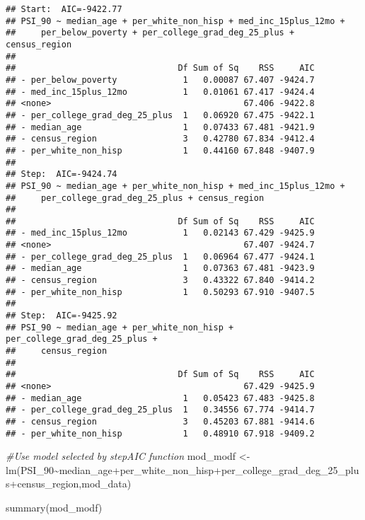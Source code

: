 \documentclass[
]{article}
\newenvironment{Shaded}{\begin{snugshade}}{\end{snugshade}}
\newcommand{\CommentTok}[1]{\textcolor[rgb]{0.56,0.35,0.01}{\textit{#1}}}
\newcommand{\FunctionTok}[1]{\textcolor[rgb]{0.00,0.00,0.00}{#1}}
\newcommand{\NormalTok}[1]{#1}
\newcommand{\OtherTok}[1]{\textcolor[rgb]{0.56,0.35,0.01}{#1}}
\newcommand{\SpecialCharTok}[1]{\textcolor[rgb]{0.00,0.00,0.00}{#1}}
\begin{document}
\begin{verbatim}
## Start:  AIC=-9422.77
## PSI_90 ~ median_age + per_white_non_hisp + med_inc_15plus_12mo + 
##     per_below_poverty + per_college_grad_deg_25_plus + census_region
## 
##                                Df Sum of Sq    RSS     AIC
## - per_below_poverty             1   0.00087 67.407 -9424.7
## - med_inc_15plus_12mo           1   0.01061 67.417 -9424.4
## <none>                                      67.406 -9422.8
## - per_college_grad_deg_25_plus  1   0.06920 67.475 -9422.1
## - median_age                    1   0.07433 67.481 -9421.9
## - census_region                 3   0.42780 67.834 -9412.4
## - per_white_non_hisp            1   0.44160 67.848 -9407.9
## 
## Step:  AIC=-9424.74
## PSI_90 ~ median_age + per_white_non_hisp + med_inc_15plus_12mo + 
##     per_college_grad_deg_25_plus + census_region
## 
##                                Df Sum of Sq    RSS     AIC
## - med_inc_15plus_12mo           1   0.02143 67.429 -9425.9
## <none>                                      67.407 -9424.7
## - per_college_grad_deg_25_plus  1   0.06964 67.477 -9424.1
## - median_age                    1   0.07363 67.481 -9423.9
## - census_region                 3   0.43322 67.840 -9414.2
## - per_white_non_hisp            1   0.50293 67.910 -9407.5
## 
## Step:  AIC=-9425.92
## PSI_90 ~ median_age + per_white_non_hisp + per_college_grad_deg_25_plus + 
##     census_region
## 
##                                Df Sum of Sq    RSS     AIC
## <none>                                      67.429 -9425.9
## - median_age                    1   0.05423 67.483 -9425.8
## - per_college_grad_deg_25_plus  1   0.34556 67.774 -9414.7
## - census_region                 3   0.45203 67.881 -9414.6
## - per_white_non_hisp            1   0.48910 67.918 -9409.2
\end{verbatim}

\begin{Shaded}
\begin{Highlighting}[]
\CommentTok{\#Use model selected by stepAIC function}
\NormalTok{mod\_modf }\OtherTok{\textless{}{-}} \FunctionTok{lm}\NormalTok{(PSI\_90}\SpecialCharTok{\textasciitilde{}}\NormalTok{median\_age}\SpecialCharTok{+}\NormalTok{per\_white\_non\_hisp}\SpecialCharTok{+}\NormalTok{per\_college\_grad\_deg\_25\_plus}\SpecialCharTok{+}\NormalTok{census\_region,mod\_data)}

\FunctionTok{summary}\NormalTok{(mod\_modf)}
\end{Highlighting}
\end{Shaded}
\end{document}
